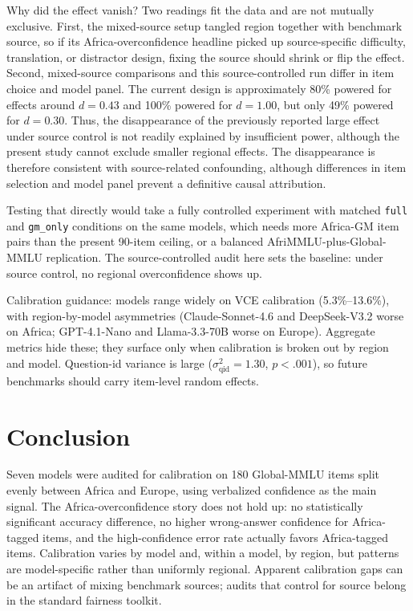 \documentclass[11pt]{article}
\begin{document}
Why did the effect vanish? Two readings fit the data and are not mutually exclusive. First, the mixed-source setup tangled region together with benchmark source, so if its Africa-overconfidence headline picked up source-specific difficulty, translation, or distractor design, fixing the source should shrink or flip the effect. Second, mixed-source comparisons and this source-controlled run differ in item choice and model panel. The current design is approximately 80\% powered for effects around $d = 0.43$ and 100\% powered for $d = 1.00$, but only 49\% powered for $d = 0.30$. Thus, the disappearance of the previously reported large effect under source control is not readily explained by insufficient power, although the present study cannot exclude smaller regional effects. The disappearance is therefore consistent with source-related confounding, although differences in item selection and model panel prevent a definitive causal attribution.

Testing that directly would take a fully controlled experiment with matched \texttt{full} and \texttt{gm\_only} conditions on the same models, which needs more Africa-GM item pairs than the present 90-item ceiling, or a balanced AfriMMLU-plus-Global-MMLU replication. The source-controlled audit here sets the baseline: under source control, no regional overconfidence shows up.

Calibration guidance: models range widely on VCE calibration (5.3\%--13.6\%), with region-by-model asymmetries (Claude-Sonnet-4.6 and DeepSeek-V3.2 worse on Africa; GPT-4.1-Nano and Llama-3.3-70B worse on Europe). Aggregate metrics hide these; they surface only when calibration is broken out by region and model. Question-id variance is large ($\sigma^2_\text{qid} = 1.30$, $p < .001$), so future benchmarks should carry item-level random effects.

\section{Conclusion}
\label{sec:conclusion}

Seven models were audited for calibration on 180 Global-MMLU items split evenly between Africa and Europe, using verbalized confidence as the main signal. The Africa-overconfidence story does not hold up: no statistically significant accuracy difference, no higher wrong-answer confidence for Africa-tagged items, and the high-confidence error rate actually favors Africa-tagged items. Calibration varies by model and, within a model, by region, but patterns are model-specific rather than uniformly regional. Apparent calibration gaps can be an artifact of mixing benchmark sources; audits that control for source belong in the standard fairness toolkit.
\end{document}

